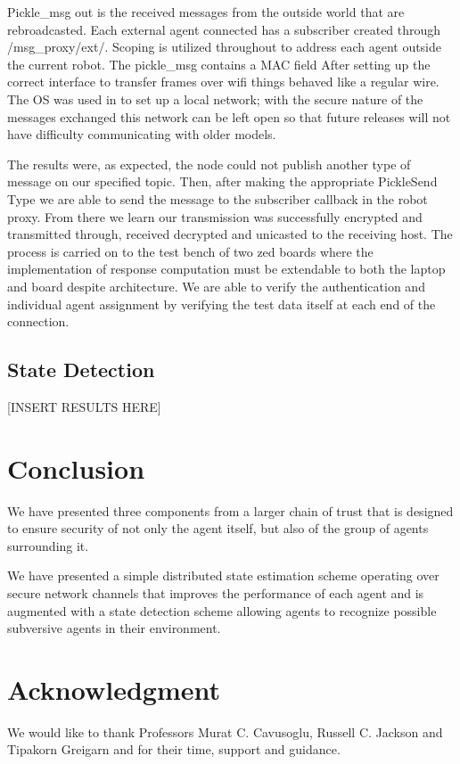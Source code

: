 \documentclass[conference]{IEEEtran}
\begin{document}
Pickle\_msg out is the received messages from the outside world that are rebroadcasted. Each external agent connected has a subscriber created through /msg\_proxy/ext/. Scoping is utilized throughout to address each agent outside the current robot. The pickle\_msg contains a MAC field After setting up the correct interface to transfer frames over wifi things behaved like a regular wire. The OS was used in to set up a local network; with the secure nature of the messages exchanged this network can be left open so that future releases will not have difficulty communicating with older models. 

The results were, as expected, the node could not publish another type of message on our specified topic. Then, after making the appropriate PickleSend Type we are able to send the message to the subscriber callback in the robot proxy. From there we learn our transmission was successfully encrypted and transmitted through, received decrypted and unicasted to the receiving host. The process is carried on to the test bench of two zed boards where the implementation of response computation must be extendable to both the laptop and board despite architecture. We are able to verify the authentication and individual agent assignment by verifying the test data itself at each end of the connection.

\subsection{State Detection}
[INSERT RESULTS HERE]

\section{Conclusion}
We have presented three components from a larger chain of trust that is designed to ensure security of not only the agent itself, but also of the group of agents surrounding it.

We have presented a simple distributed state estimation scheme operating over secure network channels that improves the performance of each agent and is augmented with a state detection scheme allowing agents to recognize possible subversive agents in their environment.

\section*{Acknowledgment}
We would like to thank Professors Murat C. Cavusoglu, Russell C. Jackson and Tipakorn Greigarn and for their time, support and guidance.

\printbibliography
\end{document}
